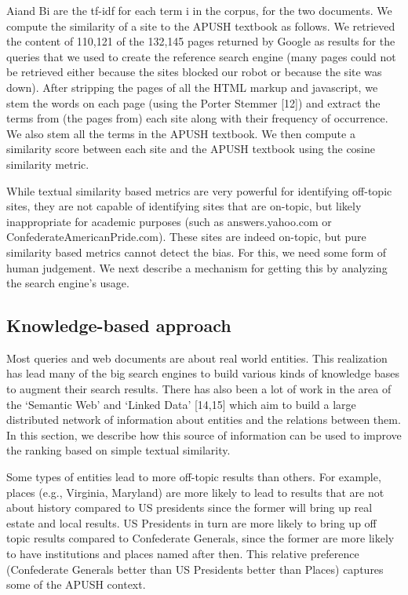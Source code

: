 \documentclass{acm_proc_article-sp}
\begin{document}
Aiand Bi are the tf-idf for each term i in the corpus, for the two documents. We
compute the similarity of a site to the APUSH textbook as follows. We retrieved
the content of 110,121 of the 132,145 pages returned by Google as results for
the queries that we used to create the reference search engine (many pages could
not be retrieved either because the sites blocked our robot or because the site
was down). After stripping the pages of all the HTML markup and javascript, we
stem the words on each page (using the Porter Stemmer [12]) and extract the
terms from (the pages from) each site along with their frequency of
occurrence. We also stem all the terms in the APUSH textbook. We then compute a
similarity score between each site and the APUSH textbook using the cosine
similarity metric.

While textual similarity based metrics are very powerful for identifying
off-topic sites, they are not capable of identifying sites that are on-topic,
but likely inappropriate for academic purposes (such as answers.yahoo.com or
ConfederateAmericanPride.com). These sites are indeed on-topic, but pure
similarity based metrics cannot detect the bias. For this, we need some form of
human judgement. We next describe a mechanism for getting this by analyzing the
search engine’s usage. 

\subsection{Knowledge-based approach}

Most queries and web documents are about real world entities.  This realization
has lead many of the big search engines to build various kinds of knowledge
bases to augment their search results. There has also been a lot of work in the
area of the ‘Semantic Web’ and ‘Linked Data’ [14,15] which aim to build a large
distributed network of information about entities and the relations between
them. In this section, we describe how this source of information can be used to
improve the ranking based on simple textual similarity. 

Some types of entities lead to more off-topic results than others. For example,
places (e.g., Virginia, Maryland) are more likely to lead to results that are
not about history compared to US presidents since the former will bring up real
estate and local results. US Presidents in turn are more likely to bring up off
topic results compared to Confederate Generals, since the former are more likely
to have institutions and places named after then. This relative preference
(Confederate Generals better than US Presidents better than Places) captures
some of the APUSH context. 
\end{document}
